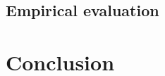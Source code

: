 \documentclass[nobib, a4paper, 10pt, oneside, onecolumn, openany, notitlepage, final,
svgnames, marginals=raggedouter, english,
]{article}
\begin{document}
\subsection{Empirical evaluation}
\label{sub:gtx_empirical_evaluation}



\section{Conclusion}


\begingroup
\small
{}
\todos

\setlength\bibitemsep{2pt}
\printbibliography
\endgroup

% 
% 
\end{document}
